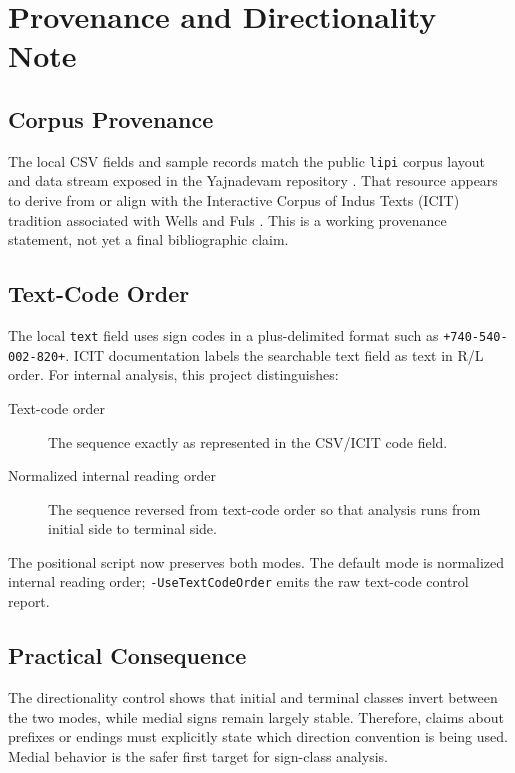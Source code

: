 \section{Provenance and Directionality Note}

\subsection{Corpus Provenance}

The local CSV fields and sample records match the public \texttt{lipi} corpus layout and data stream exposed in the Yajnadevam repository \citep{yajnadevamLipi}. That resource appears to derive from or align with the Interactive Corpus of Indus Texts (ICIT) tradition associated with Wells and Fuls \citep{fulsICIT}. This is a working provenance statement, not yet a final bibliographic claim.

\subsection{Text-Code Order}

The local \texttt{text} field uses sign codes in a plus-delimited format such as \texttt{+740-540-002-820+}. ICIT documentation labels the searchable text field as text in R/L order. For internal analysis, this project distinguishes:

\begin{description}
  \item[Text-code order] The sequence exactly as represented in the CSV/ICIT code field.
  \item[Normalized internal reading order] The sequence reversed from text-code order so that analysis runs from initial side to terminal side.
\end{description}

The positional script now preserves both modes. The default mode is normalized internal reading order; \texttt{-UseTextCodeOrder} emits the raw text-code control report.

\subsection{Practical Consequence}

The directionality control shows that initial and terminal classes invert between the two modes, while medial signs remain largely stable. Therefore, claims about prefixes or endings must explicitly state which direction convention is being used. Medial behavior is the safer first target for sign-class analysis.

